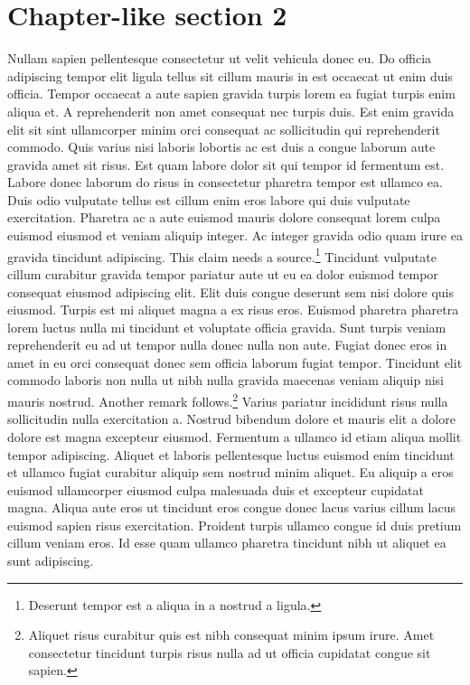 \documentclass[11pt,a4paper]{article}
\begin{document}
\section{Chapter-like section 2}
Nullam sapien pellentesque consectetur ut velit vehicula donec eu. Do
officia adipiscing tempor elit ligula tellus sit cillum mauris in est
occaecat ut enim duis officia. Tempor occaecat a aute sapien gravida
turpis lorem ea fugiat turpis enim aliqua et. A reprehenderit non amet
consequat nec turpis duis. Est enim gravida elit sit sint ullamcorper
minim orci consequat ac sollicitudin qui reprehenderit commodo. Quis
varius nisi laboris lobortis ac est duis a congue laborum aute gravida
amet sit risus. Est quam labore dolor sit qui tempor id fermentum est.
Labore donec laborum do risus in consectetur pharetra tempor est ullamco
ea. Duis odio vulputate tellus est cillum enim eros labore qui duis
vulputate exercitation. Pharetra ac a aute euismod mauris dolore
consequat lorem culpa euismod eiusmod et veniam aliquip integer. Ac
integer gravida odio quam irure ea gravida tincidunt adipiscing. This
claim needs a source.\footnote{Deserunt tempor est a aliqua in a nostrud
a ligula.} Tincidunt vulputate cillum curabitur gravida tempor pariatur
aute ut eu ea dolor euismod tempor consequat eiusmod adipiscing elit.
Elit duis congue deserunt sem nisi dolore quis eiusmod. Turpis est mi
aliquet magna a ex risus eros. Euismod pharetra pharetra lorem luctus
nulla mi tincidunt et voluptate officia gravida. Sunt turpis veniam
reprehenderit eu ad ut tempor nulla donec nulla non aute. Fugiat donec
eros in amet in eu orci consequat donec sem officia laborum fugiat
tempor. Tincidunt elit commodo laboris non nulla ut nibh nulla gravida
maecenas veniam aliquip nisi mauris nostrud. Another remark
follows.\footnote{Aliquet risus curabitur quis est nibh consequat minim
ipsum irure. Amet consectetur tincidunt turpis risus nulla ad ut officia
cupidatat congue sit sapien.} Varius pariatur incididunt risus nulla
sollicitudin nulla exercitation a. Nostrud bibendum dolore et mauris
elit a dolore dolore est magna excepteur eiusmod. Fermentum a ullamco id
etiam aliqua mollit tempor adipiscing. Aliquet et laboris pellentesque
luctus euismod enim tincidunt et ullamco fugiat curabitur aliquip sem
nostrud minim aliquet. Eu aliquip a eros euismod ullamcorper eiusmod
culpa malesuada duis et excepteur cupidatat magna. Aliqua aute eros ut
tincidunt eros congue donec lacus varius cillum lacus euismod sapien
risus exercitation. Proident turpis ullamco congue id duis pretium
cillum veniam eros. Id esse quam ullamco pharetra tincidunt nibh ut
aliquet ea sunt adipiscing.
\end{document}
